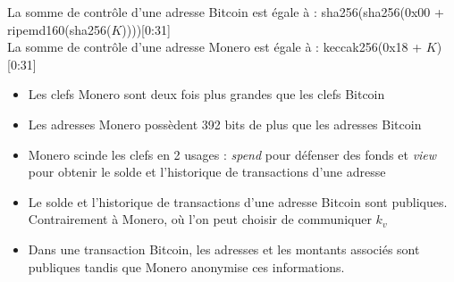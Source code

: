 \noindent 
La somme de contrôle d'une adresse Bitcoin est égale à : 
sha256(sha256(0x00 + ripemd160(sha256($K$))))[0:31]\\
La somme de contrôle d'une adresse Monero est égale à : 
keccak256(0x18 + $K$)[0:31]

\bigskip 

\begin{itemize}
    \item Les clefs Monero sont deux fois plus grandes que les clefs Bitcoin
    \item Les adresses Monero possèdent 392 bits de plus que les adresses Bitcoin
    \item Monero scinde les clefs en 2 usages : \og \textit{spend} \fg pour défenser 
    des fonds et \og \textit{view} \fg pour obtenir le solde et l'historique de transactions
    d'une adresse
    \item Le solde et l'historique de transactions d'une adresse Bitcoin sont publiques.
    Contrairement à Monero, où l'on peut choisir de communiquer $k_v$
    \item Dans une transaction Bitcoin, les adresses et les montants associés 
    sont publiques tandis que Monero anonymise ces informations.
\end{itemize}